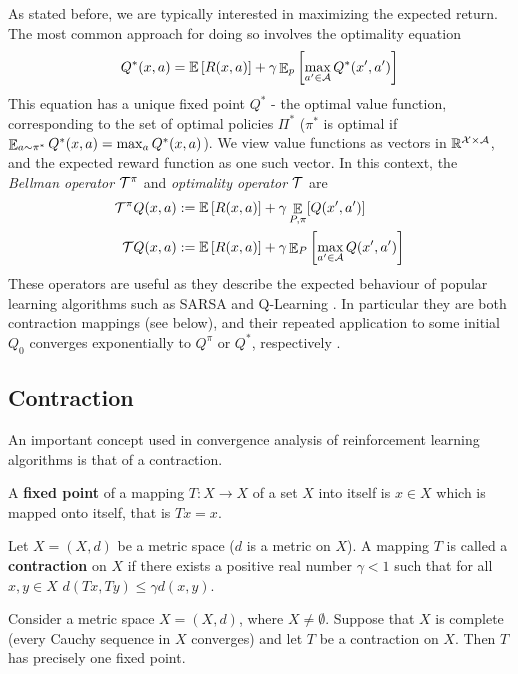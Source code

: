 As stated before, we are typically interested in maximizing the expected return. The most common approach for doing so involves the optimality equation
\begin{equation}\label{eqn:q}
Q^*(x,a) = \mathbb{E}\left[ {R(x,a)} \right] + \gamma \mathop{\mathbb{E}}\nolimits_p \left[ {\max_{a' \in \mathcal{A}} Q^*(x', a')} \right]
\end{equation}
This equation has a unique fixed point $Q^*$ -  the optimal value function, corresponding to the set of optimal policies $\Pi^*$ ($\pi^*$ is optimal if $\mathop{\mathbb{E}}_{a \sim \pi^*} Q^*(x, a) = \max_a Q^*(x,a)$).
We view value functions as vectors in $\mathbb{R}^{\mathcal{X} \times \mathcal{A}}$, and the expected reward function as one such vector. In this context, the \emph{Bellman operator} $\mathcal{T}^\pi$ and \emph{optimality operator} $\mathcal{T}$ are
\begin{align}
\mathcal{T}^\pi Q(x,a) &:= \mathbb{E}\left[ { R(x, a)} \right] + \gamma \mathop{\mathbb{E}}_{P, \pi} [Q(x',a')]\\
\mathcal{T} Q(x,a) &:= \mathbb{E}\left[ { R(x, a)} \right] + \gamma \mathop{\mathbb{E}}\nolimits_{P} \left[ {\max_{a' \in \mathcal{A}}Q(x', a')} \right]\label{eqn:bellmanoptimalityoperator}
\end{align}
These operators are useful as they describe the expected behaviour of popular learning algorithms such as SARSA and Q-Learning \cite{sutton1998reinforcement}. In particular they are both contraction mappings (see below), and their repeated application to some initial $Q_0$ converges exponentially to $Q^\pi$ or $Q^*$, respectively \citep{bertsekas1995neuro}.

\subsection{Contraction}\label{sec:contraction}
An important concept used in convergence analysis of reinforcement learning algorithms is that of a contraction.
\begin{definition}
A \textbf{fixed point} of a mapping $T: X\to X$ of a set $X$ into itself is $x\in X$ which is mapped onto itself, that is $Tx=x$.

Let $X=(X,d)$ be a metric space ($d$ is a metric on $X$). A mapping $T$ is called a \textbf{contraction} on $X$ if there exists a positive real number $\gamma < 1$ such that for all $x, y \in X$ $d(Tx, Ty) \le \gamma d(x,y)$.
\end{definition}

\begin{theorem}
Consider a metric space $X=(X,d)$, where $X \neq \emptyset$. Suppose that $X$ is complete (every Cauchy sequence in $X$ converges) and let $T$ be a contraction on $X$. Then $T$ has precisely one fixed point.
\end{theorem}

